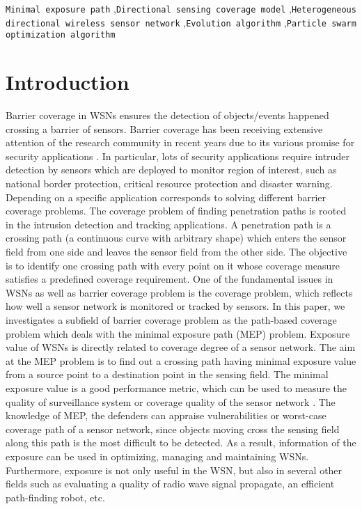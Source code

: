 \documentclass[final]{elsarticle}
\begin{document}
\begin{frontmatter}
\begin{abstract}
\end{abstract}
\begin{keyword}
\texttt{Minimal exposure path} \sep \texttt{Directional sensing coverage model} \sep \texttt{Heterogeneous directional wireless sensor network} \sep \texttt{Evolution algorithm} \sep\texttt{Particle swarm optimization algorithm}
\end{keyword}
\end{frontmatter}
\section{Introduction}
Barrier coverage in WSNs ensures the detection of objects/events happened crossing a barrier of sensors. Barrier coverage has been receiving extensive attention of the research community in recent years due to its various promise for security applications \cite{wu2016survey,wang2011coverage,b15}. In particular, lots of security applications require intruder detection by sensors which are deployed to monitor region of interest, such as national border protection, critical resource protection and disaster warning. Depending on a specific application corresponds to solving different barrier coverage problems. The coverage problem of finding penetration paths is rooted in the intrusion detection and tracking applications. A penetration path is a crossing path (a continuous curve with arbitrary shape) which enters the sensor field from one side and leaves the sensor field from the other side. The objective is to identify one crossing path with every point on it whose coverage measure satisfies a predefined coverage requirement. One of the fundamental issues in WSNs as well as barrier coverage problem is the coverage problem, which reflects how well a sensor network is monitored or tracked by sensors. In this paper, we investigates a subfield of barrier coverage problem as the path-based coverage problem which deals with the minimal exposure path (MEP) problem. Exposure value of WSNs is directly related to coverage degree of a sensor network. The aim at the MEP problem is to find out a crossing path having minimal exposure value from a source point to a destination point in the sensing field. The minimal exposure value is a good performance metric, which can be used to measure the quality of surveillance system or coverage quality of the sensor network \cite{b13,b17}. The knowledge of MEP, the defenders can appraise vulnerabilities or worst-case coverage path of a sensor network, since objects moving cross the sensing field along this path is the most difficult to be detected. As a result, information of the exposure can be used in optimizing, managing and maintaining WSNs. Furthermore, exposure is not only useful in the WSN, but also in several other fields such as evaluating a quality of radio wave signal propagate, an efficient path-finding robot, etc.
\end{document}
